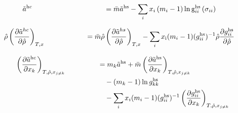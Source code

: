 \documentclass[12pt, letterpaper]{article}
\begin{document}
\begin{equation}
    \begin{aligned}
        \mathmakebox[11.5em][l]{\tilde{a}^{\mathrm{hc}}}
        &=
        \bar{m} \tilde{a}^{\mathrm{hs}}
        -\sum_{i} x_{i}\left(m_{i}-1\right) \ln \mathrm{g}_{i i}^{\mathrm{hs}}\left(\sigma_{i i}\right)
    \end{aligned}
    \label{eq:ares_hc}
\end{equation}



\begin{equation}
    \begin{aligned}
        \mathmakebox[11.5em][l]{\hat{\rho}\left(\frac{\partial\tilde{a}^{hc}}{\partial\hat{\rho}}\right)_{T,x}}
        &=
        \bar{m}\hat{\rho}\left(\frac{\partial\tilde{a}^{hs}}{\partial\hat{\rho}}\right)_{T,x}
        -\sum_{i}x_{\mathrm{i}}(m_{i}-1)(g_{ii}^\mathrm{hs})^{-1}\hat{\rho}\frac{\partial g_{ii}^\mathrm{hs}}{\partial\hat{\rho}}
    \end{aligned}
    \label{eq:hc_ares_dadrho}
\end{equation}


\begin{equation}
    \begin{aligned}
        \mathmakebox[11.5em][l]{\left(\frac{\partial\tilde{a}^{\mathrm{hc}}}{\partial x_{k}}\right)_{T,\hat{\rho},x_{j\neq k}}}
        &=m_{k}\tilde{a}^{\mathrm{hs}}
        +\bar{m}\left(\frac{\partial\tilde{a}^{\mathrm{hs}}}{\partial x_{k}}\right)_{T,\hat{\rho},x_{j\neq k}}
        \\
        &\quad -(m_k-1)\ln g_{kk}^{\mathrm{hs}}
        \\
        &\quad -\sum_{i}x_{i}(m_{i}-1)(g_{ii}^{\mathrm{hs}})^{-1}
        \left(\frac{\partial g_{ii}^{\mathrm{hs}}}{\partial x_{k}}\right)_{T,\hat{\rho},x_{j\neq k}}
    \end{aligned}
    \label{eq:hc_ares_dxk}
\end{equation}
\end{document}
